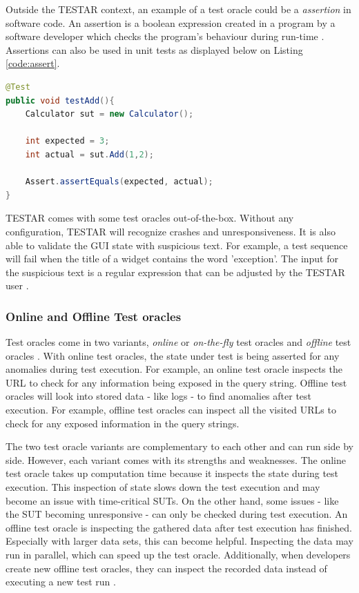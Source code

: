 Outside the TESTAR context, an example of a test oracle could be a \emph{assertion} in software code. An assertion is a boolean expression created in a program by a software developer which checks the program's behaviour during run-time \cite{barr2014oracle}. Assertions can also be used in unit tests as displayed below on Listing \ref{code:assert}. 

\begin{lstlisting}[language=Java, caption=Example assertion, label=code:assert]
@Test
public void testAdd(){
    Calculator sut = new Calculator();

    int expected = 3;
    int actual = sut.Add(1,2);

    Assert.assertEquals(expected, actual);
}
\end{lstlisting}

TESTAR comes with some test oracles out-of-the-box. Without any configuration, TESTAR will recognize crashes and unresponsiveness. It is also able to validate the GUI state with suspicious text. For example, a test sequence will fail when the title of a widget contains the word 'exception'. The input for the suspicious text is a regular expression that can be adjusted by the TESTAR user \cite{VosAho2021}. 

\subsubsection{Online and Offline Test oracles}
Test oracles come in two variants, \emph{online} or \emph{on-the-fly} test oracles and \emph{offline} test oracles \cite{VosAho2021}. With online test oracles, the state under test is being asserted for any anomalies during test execution. For example,  an online test oracle inspects the URL to check for any information being exposed in the query string. Offline test oracles will look into stored data - like logs - to find anomalies after test execution. For example, offline test oracles can inspect all the visited URLs to check for any exposed information in the query strings.

The two test oracle variants are complementary to each other and can run side by side. However, each variant comes with its strengths and weaknesses. The online test oracle takes up computation time because it inspects the state during test execution. This inspection of state slows down the test execution and may become an issue with time-critical SUTs. On the other hand, some issues - like the SUT becoming unresponsive - can only be checked during test execution. An offline test oracle is inspecting the gathered data after test execution has finished. Especially with larger data sets, this can become helpful. Inspecting the data may run in parallel, which can speed up the test oracle. Additionally, when developers create new offline test oracles, they can inspect the recorded data instead of executing a new test run \cite{de2019offline}.

